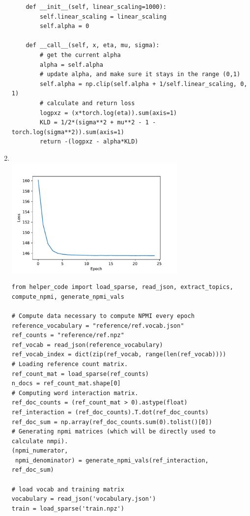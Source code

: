 \documentclass{article}
\begin{document}
\begin{enumerate}
\begin{verbatim}
    def __init__(self, linear_scaling=1000):
        self.linear_scaling = linear_scaling
        self.alpha = 0
        
    def __call__(self, x, eta, mu, sigma):
        # get the current alpha
        alpha = self.alpha
        # update alpha, and make sure it stays in the range (0,1)
        self.alpha = np.clip(self.alpha + 1/self.linear_scaling, 0, 1)
        # calculate and return loss
        logpxz = (x*torch.log(eta)).sum(axis=1)
        KLD = 1/2*(sigma**2 + mu**2 - 1 - torch.log(sigma**2)).sum(axis=1)
        return -(logpxz - alpha*KLD)
        \end{verbatim}

        \newpage
        \item \, \\
        \includegraphics[width=0.7\textwidth]{code/A6e.pdf} \\
        \begin{verbatim}
from helper_code import load_sparse, read_json, extract_topics, compute_npmi, generate_npmi_vals

# Compute data necessary to compute NPMI every epoch
reference_vocabulary = "reference/ref.vocab.json"
ref_counts = "reference/ref.npz"
ref_vocab = read_json(reference_vocabulary)
ref_vocab_index = dict(zip(ref_vocab, range(len(ref_vocab))))
# Loading reference count matrix.
ref_count_mat = load_sparse(ref_counts)
n_docs = ref_count_mat.shape[0]
# Computing word interaction matrix.
ref_doc_counts = (ref_count_mat > 0).astype(float)
ref_interaction = (ref_doc_counts).T.dot(ref_doc_counts)
ref_doc_sum = np.array(ref_doc_counts.sum(0).tolist()[0])
# Generating npmi matrices (which will be directly used to calculate nmpi).
(npmi_numerator,
 npmi_denominator) = generate_npmi_vals(ref_interaction, ref_doc_sum)

# load vocab and training matrix
vocabulary = read_json('vocabulary.json')
train = load_sparse('train.npz')


\end{verbatim}
\end{enumerate}
\end{document}
